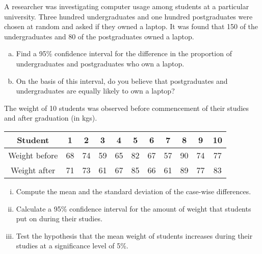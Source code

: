 

\item 

A researcher was investigating computer usage among students at a particular university. Three hundred undergraduates and one hundred postgraduates were chosen at random and asked if they owned a laptop. It was found that 150 of the undergraduates and 80 of the postgraduates owned a laptop. 
\begin{enumerate}[(a)]
    \item Find a 95\% confidence interval for the difference in the proportion of undergraduates and postgraduates who own a laptop. 
    \item On the basis of this interval, do you believe that postgraduates and undergraduates are equally likely to own a laptop? 
\end{enumerate}


\item 

The weight of 10 students was observed before commencement of their studies and after graduation (in kgs).

\begin{center}
    \begin{tabular}{|c||c|c|c|c|c|c|c|c|c|c|} \hline 
Student &	1&	2	&3	&4	&5	&6	&7	&8	&9	&10\\ \hline 
Weight before &	68	& 74	& 59	& 65	& 82&67&57&90&74&77\\ \hline 
Weight after&71&73&61&67&85&66&61&89&77&83\\ \hline 
\end{tabular}
\end{center}


\begin{enumerate}[(i)]
\item Compute the mean and the standard deviation of the case-wise differences.
	\item  Calculate a 95\% confidence interval for the amount of weight that students put on during their studies. 
	\item   Test the hypothesis that the mean weight of students increases during their studies at a significance level of  5\%. 
\end{enumerate}



